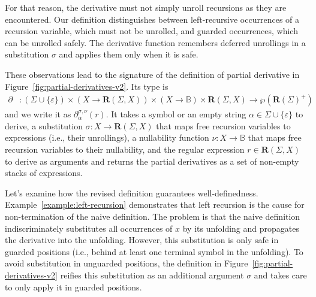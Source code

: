 \documentclass[runningheads, envcountsame, a4paper]{llncs}
\newcommand\Power{\wp}
\newcommand\bool{\mathbb{B}}
\newcommand\pderiv[3][{}]{\partial^{#1}_{#3}(#2)}
\newcommand\Reg{\mathbf{R}}
\begin{document}
For that reason, the derivative must not simply unroll recursions as they are
encountered. Our definition distinguishes between
left-recursive occurrences of a recursion variable, which must not be
unrolled, and guarded occurrences, which can be unrolled
safely. The derivative function remembers deferred unrollings
in a substitution $\sigma$ and applies them only when it is safe.

These observations lead to the signature of the definition of partial derivative in
Figure~\ref{fig:partial-derivatives-v2}. Its type is
\begin{align*}
  \partial &: (\Sigma \cup \{\varepsilon\}) \times (X \to \Reg (\Sigma, X)) \times (X \to
  \bool) \times \Reg (\Sigma, X) \to \Power ( \Reg (\Sigma)^+) 
\end{align*}
and we write it as $\pderiv[\sigma,\nu]{r}{\alpha}$.
It takes a symbol or an empty string $\alpha\in\Sigma \cup
\{\varepsilon\}$ to derive, a substitution $\sigma: X \to \Reg
(\Sigma, X)$ that maps 
free recursion variables to expressions (i.e., their unrollings), a nullability function $\nu:X \to \bool$
that maps free recursion variables to their nullability, and
the regular expression $r \in \Reg (\Sigma, X)$ to derive as arguments and returns the
partial derivatives as a set of non-empty stacks of
expressions. 

Let's examine how the revised definition guarantees well-definedness.
Example~\ref{example:left-recursion} demonstrates that left recursion is the cause for
non-termination of the naive definition. The problem is that the naive definition indiscriminately
substitutes all occurrences of $x$ by its unfolding and propagates the
derivative into the unfolding. However, this substitution is only safe in
guarded positions (i.e., behind at
least one terminal symbol in the unfolding). To avoid substitution in
unguarded positions, the definition in Figure~\ref{fig:partial-derivatives-v2} reifies this
substitution as an additional argument $\sigma$ and 
takes care to only apply it in guarded positions. 
\end{document}
